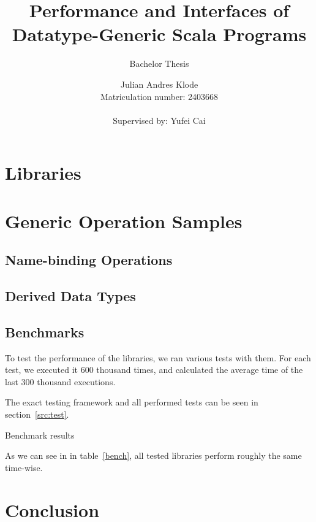 \documentclass[abstracton,parskip=half]{scrreprt}
\author{Julian Andres Klode\\Matriculation number: 2403668\\\\Supervised by: Yufei Cai}
\title{Performance and Interfaces of Datatype-Generic Scala Programs}
\subtitle{Bachelor Thesis}
\date{}
\theoremstyle{definition}
\begin{document}
    \maketitle{}
    

    \tableofcontents{}
    \clearpage
    \setcounter{page}{1}

    
    
    \chapter{Libraries}
    
    

    \clearpage{}
    
    
    \chapter{Generic Operation Samples}
    \section{Name-binding Operations}
    \section{Derived Data Types}
    

    \section{Benchmarks}

    To test the performance of the libraries, we ran various tests with them. For
    each test, we executed it 600 thousand times, and calculated the average
    time of the last 300 thousand executions.

    The exact testing framework and all performed tests can be seen in
    section~\ref{src:test}.

    \begin{table}[ht]
    
    \caption{Benchmark results}
    \label{bench}
    \end{table}

    As we can see in in table~\ref{bench}, all tested libraries perform roughly
    the same time-wise.


    \chapter{Conclusion}
\end{document}

